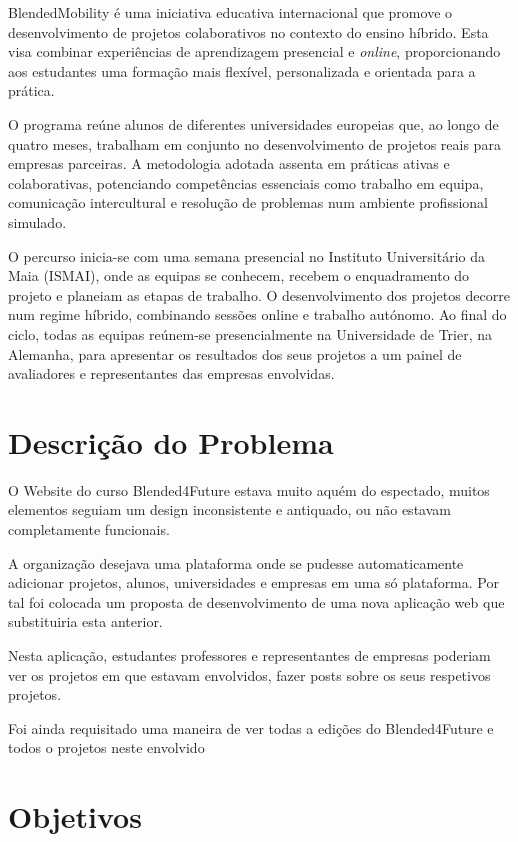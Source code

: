 BlendedMobility é uma iniciativa educativa internacional que promove o desenvolvimento de projetos colaborativos no contexto do ensino híbrido. Esta visa combinar experiências de aprendizagem presencial e \textit{online}, proporcionando aos estudantes uma formação mais flexível, personalizada e orientada para a prática.

O programa reúne alunos de diferentes universidades europeias que, ao longo de quatro meses, trabalham em conjunto no desenvolvimento de projetos reais para empresas parceiras. A metodologia adotada assenta em práticas ativas e colaborativas, potenciando competências essenciais como trabalho em equipa, comunicação intercultural e resolução de problemas num ambiente profissional simulado.

O percurso inicia-se com uma semana presencial no Instituto Universitário da Maia (ISMAI), onde as equipas se conhecem, recebem o enquadramento do projeto e planeiam as etapas de trabalho. O desenvolvimento dos projetos decorre num regime híbrido, combinando sessões online e trabalho autónomo. Ao final do ciclo, todas as equipas reúnem-se presencialmente na Universidade de Trier, na Alemanha, para apresentar os resultados dos seus projetos a um painel de avaliadores e representantes das empresas envolvidas.


\section{Descrição do Problema}
\label{sec:introducao_descproblema}

O Website do curso Blended4Future estava muito aquém do espectado, muitos elementos seguiam um design inconsistente e antiquado, ou não estavam completamente funcionais. 

A organização desejava uma plataforma onde se pudesse automaticamente adicionar projetos, alunos, universidades e empresas em uma só plataforma. Por tal foi colocada um proposta de desenvolvimento de uma nova aplicação web que substituiria esta anterior. 

Nesta aplicação, estudantes professores e representantes de empresas poderiam ver os projetos em que estavam envolvidos, fazer posts sobre os seus respetivos projetos.

Foi ainda requisitado uma maneira de ver todas a edições do Blended4Future e todos o projetos neste envolvido

\section{Objetivos}

